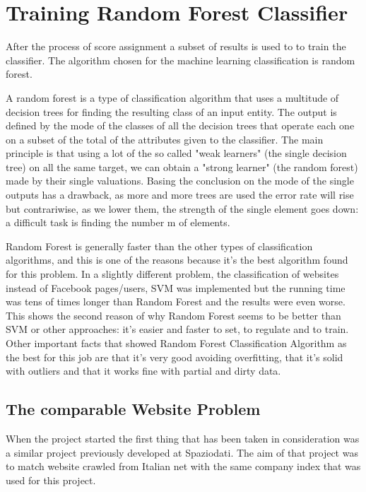 \section{Training Random Forest Classifier}

After the process of score assignment a subset of results is used to to train the classifier. The algorithm chosen for the machine learning classification is random forest.


A random forest is a type of classification algorithm that uses a multitude of decision trees for finding the resulting class of an input entity. The output is defined by the mode of the classes of all the decision trees that operate each one on a subset of the total of the attributes given to the classifier. The main principle is that using a lot of the so called "weak learners" (the single decision tree) on all the same target, we can obtain a "strong learner" (the random forest) made by their single valuations. Basing the conclusion on the mode of the single outputs has a drawback, as more and more trees are used the error rate will rise but contrariwise, as we lower them, the strength of the single element goes down: a difficult task is finding the number m of elements.

Random Forest is generally faster than the other types of classification algorithms, and this is one of the reasons because it's the best algorithm found for this problem\cite{randomforestart}. In a slightly different problem, the classification of websites instead of Facebook pages/users, SVM was implemented but the running time was tens of times longer than Random Forest and the results were even worse. This shows the second reason of why Random Forest seems to be better than SVM or other approaches: it's easier and faster to set, to regulate and to train.
Other important facts that showed Random Forest Classification Algorithm as the best for this job are that it's very good avoiding overfitting, that it's solid with outliers and that it works fine with partial and dirty data.

\subsection*{The comparable Website Problem}
When the project started the first thing that has been taken in consideration was a similar project previously developed at Spaziodati. The aim of that project was to match website crawled from Italian net with the same company index that was used for this project.

